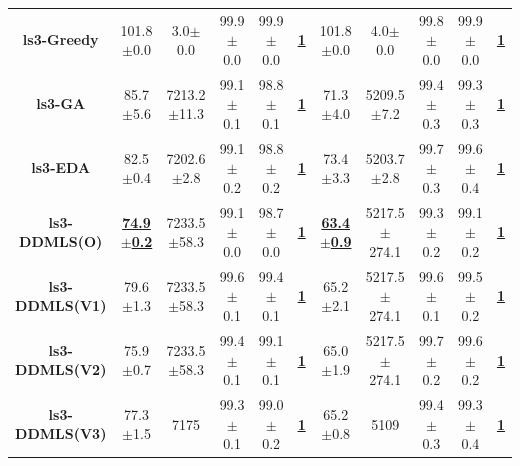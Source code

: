 \documentclass[lettersize,journal]{IEEEtran}
\begin{document}
\begin{table}[!t]
{\begin{tabular}{ccccccccccc}
    \midrule
    {\bfseries ls3-Greedy} &101.8$\pm$0.0 &3.0$\pm$0.0 & 99.9$\pm$0.0 &99.9$\pm$0.0 &\underline{\bfseries 1} &101.8$\pm$0.0 &4.0$\pm$0.0& 99.8$\pm$0.0 &99.9$\pm$0.0 &\underline{\bfseries 1} \\
    {\bfseries ls3-GA} &85.7$\pm$5.6 &7213.2$\pm$11.3 & 99.1$\pm$0.1 &98.8$\pm$0.1 &\underline{\bfseries 1} &71.3$\pm$4.0 &5209.5$\pm$7.2& 99.4$\pm$0.3 &99.3$\pm$0.3 &\underline{\bfseries 1} \\
    {\bfseries ls3-EDA} &82.5$\pm$0.4 &7202.6$\pm$2.8 & 99.1$\pm$0.2 &98.8$\pm$0.2 &\underline{\bfseries 1} &73.4$\pm$3.3 &5203.7$\pm$2.8& 99.7$\pm$0.3 &99.6$\pm$0.4 &\underline{\bfseries 1} \\
    \bfseries ls3-DDMLS(O) &\underline{\bfseries 74.9$\pm$0.2} &7233.5$\pm$58.3 & 99.1$\pm$0.0 &98.7$\pm$0.0 &\underline{\bfseries 1} &\underline{\bfseries 63.4$\pm$0.9} &5217.5$\pm$274.1& 99.3$\pm$0.2 &99.1$\pm$0.2 &\underline{\bfseries 1} \\
    {\bfseries ls3-DDMLS(V1)} &79.6$\pm$1.3 &7233.5$\pm$58.3 & 99.6$\pm$0.1 &99.4$\pm$0.1 &\underline{\bfseries 1} &65.2$\pm$2.1 &5217.5$\pm$274.1& 99.6$\pm$0.1 &99.5$\pm$0.2 &\underline{\bfseries 1} \\
    {\bfseries ls3-DDMLS(V2)} &75.9$\pm$0.7 &7233.5$\pm$58.3 & 99.4$\pm$0.1 &99.1$\pm$0.1 &\underline{\bfseries 1} &65.0$\pm$1.9 &5217.5$\pm$274.1& 99.7$\pm$0.2 &99.6$\pm$0.2 &\underline{\bfseries 1} \\
    {\bfseries ls3-DDMLS(V3)} &77.3$\pm$1.5 &7175 & 99.3$\pm$0.1 &99.0$\pm$0.2 &\underline{\bfseries 1} &65.2$\pm$0.8 &5109& 99.4$\pm$0.3 &99.3$\pm$0.4 &\underline{\bfseries 1} \\


\end{tabular}}
\end{table}
\end{document}
